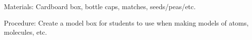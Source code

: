 \begin{multicols}{2}
\begin{description*}
\item[Materials:]{Cardboard box, bottle caps, matches, seeds/peas/etc.}
\item[Procedure:]{Create a model box for students to use when making models of atoms, molecules, etc.}
\end{description*}


\end{multicols}


\pagebreak